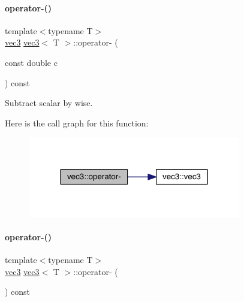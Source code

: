 \paragraph{\texorpdfstring{operator-\/()}{operator-()}\hspace{0.1cm}{\footnotesize\ttfamily [2/3]}}
{\footnotesize\ttfamily template$<$typename T$>$ \\
\mbox{\hyperlink{structvec3}{vec3}} \mbox{\hyperlink{structvec3}{vec3}}$<$ T $>$\+::operator-\/ (\begin{DoxyParamCaption}\item[{const double}]{c }\end{DoxyParamCaption}) const\hspace{0.3cm}{\ttfamily [inline]}}



Subtract scalar by wise. 

Here is the call graph for this function\+:\nopagebreak
\begin{figure}[H]
\begin{center}
\leavevmode
\includegraphics[width=263pt]{structvec3_a00615545da4a7f61be923dc8c4e0557e_cgraph}
\end{center}
\end{figure}
\mbox{\label{structvec3_a9ee0d5d83bd70141b9424928d0ea9c98}} 
\paragraph{\texorpdfstring{operator-\/()}{operator-()}\hspace{0.1cm}{\footnotesize\ttfamily [3/3]}}
{\footnotesize\ttfamily template$<$typename T$>$ \\
\mbox{\hyperlink{structvec3}{vec3}} \mbox{\hyperlink{structvec3}{vec3}}$<$ T $>$\+::operator-\/ (\begin{DoxyParamCaption}{ }\end{DoxyParamCaption}) const\hspace{0.3cm}{\ttfamily [inline]}}



